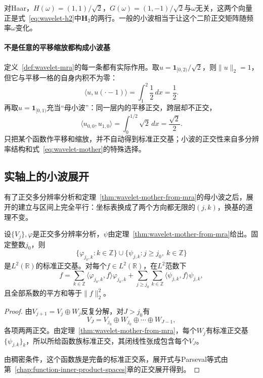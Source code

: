 对Haar，$H(\omega)=(1,1)/\sqrt2$，$G(\omega)=(1,-1)/\sqrt2$与$\omega$无关，这两个向量正是式~\eqref{eq:wavelet-h2}中$\bm H_2$的两行。一般的小波相当于让这个二阶正交矩阵随频率$\omega$变化。

\paragraph{不是任意的平移缩放都构成小波基}
定义~\ref{def:wavelet-mra}的每一条都有实际作用。取$u=\mathbf{1}_{[0,2)}/\sqrt2$，则$\lVert u\rVert_2=1$，但它与平移一格的自身内积不为零：
\[
 \langle u,u(\cdot-1)\rangle=\int_1^2\frac12\,dx=\frac12.
\]
再取$u=\mathbf{1}_{[0,1)}$充当“母小波”：同一层内的平移正交，跨层却不正交，
\[
 \langle u_{0,0},u_{1,0}\rangle=\int_0^{1/2}\sqrt2\,dx=\frac{\sqrt2}2.
\]
只把某个函数作平移和缩放，并不自动得到标准正交基；小波的正交性来自多分辨率结构和式~\eqref{eq:wavelet-mother}的特殊选择。

\subsection{实轴上的小波展开}
\label{sec:wavelet-real-line-expansion}

有了正交多分辨率分析和定理~\ref{thm:wavelet-mother-from-mra}的母小波之后，展开的建立与区间上完全平行：坐标表换成了两个方向都无限的$(j,k)$，换基的道理不变。

\begin{theorem}[实轴上的小波展开]
\label{thm:wavelet-real-line-expansion}
设$\{V_j\},\varphi$是正交多分辨率分析，$\psi$由定理~\ref{thm:wavelet-mother-from-mra}给出。固定整数$j_0$，则
\begin{equation}
 \{\varphi_{j_0,k}:k\in\mathbb Z\}\cup\{\psi_{j,k}:j\geq j_0,\ k\in\mathbb Z\}
 \label{eq:wavelet-real-line-family}
\end{equation}
是$L^2(\mathbb R)$的标准正交基。对每个$f\in L^2(\mathbb R)$，在$L^2$范数下
\begin{equation}
 f=\sum_{k\in\mathbb Z}\langle\varphi_{j_0,k},f\rangle\varphi_{j_0,k}
 +\sum_{j\geq j_0}\sum_{k\in\mathbb Z}\langle\psi_{j,k},f\rangle\psi_{j,k},
 \label{eq:wavelet-real-line-expansion}
\end{equation}
且全部系数的平方和等于$\lVert f\rVert_2^2$。
\end{theorem}

\begin{proof}
由$V_{j+1}=V_j\oplus W_j$反复分解，对$J>j_0$有
\[
 V_J=V_{j_0}\oplus W_{j_0}\oplus\cdots\oplus W_{J-1},
\]
各项两两正交。由定理~\ref{thm:wavelet-mother-from-mra}，每个$W_j$有标准正交基$\{\psi_{j,k}\}_k$，所以所给函数族标准正交，其闭线性张成包含每个$V_J$。

由稠密条件，这个函数族是完备的标准正交系，展开式与Parseval等式由第~\ref{chap:function-inner-product-spaces}章的正交展开得到。
\end{proof}

